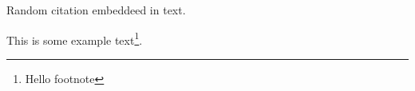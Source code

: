 \documentclass{article}
\begin{document}
Random citation \autocite[1]{DUMMY:1} embeddeed in text.

\newpage

This is some example text\footnote{\label{myfootnote}Hello footnote}.


\printbibliography
\end{document}
